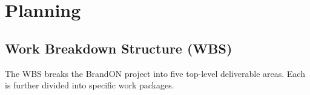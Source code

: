 \documentclass[12pt,a4paper]{report}
\begin{document}
\chapter{Planning}

\section{Work Breakdown Structure (WBS)}

The WBS breaks the BrandON project into five top-level deliverable areas. Each is further divided into specific work packages.
\end{document}
